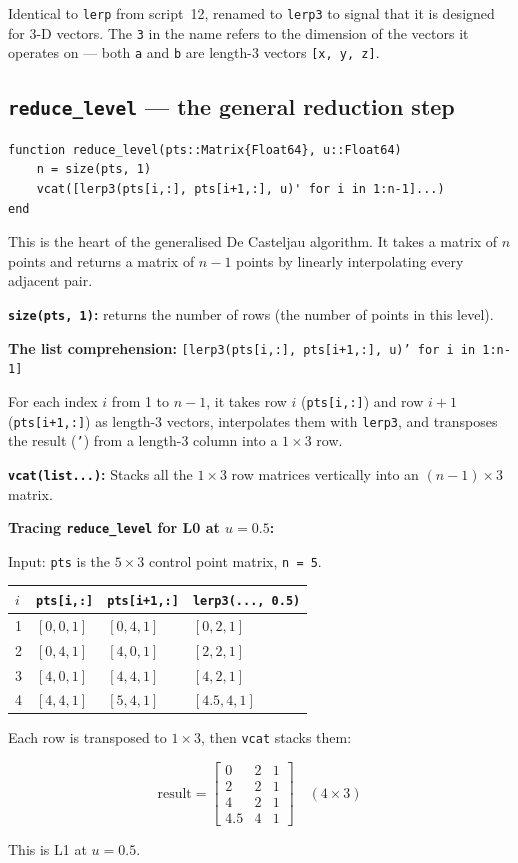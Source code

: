 \documentclass[12pt, a4paper]{article}
\newcommand{\cd}[1]{\texttt{#1}}
\begin{document}
Identical to \cd{lerp} from script~12, renamed to
\cd{lerp3} to signal that it is designed for 3-D vectors.
The \cd{3} in the name refers to the dimension of the
vectors it operates on --- both \cd{a} and \cd{b} are
length-3 vectors \cd{[x, y, z]}.

\subsection{\texttt{reduce\_level} --- the general reduction step}

\begin{verbatim}
function reduce_level(pts::Matrix{Float64}, u::Float64)
    n = size(pts, 1)
    vcat([lerp3(pts[i,:], pts[i+1,:], u)' for i in 1:n-1]...)
end
\end{verbatim}

This is the heart of the generalised De Casteljau algorithm.
It takes a matrix of $n$ points and returns a matrix of
$n-1$ points by linearly interpolating every adjacent pair.

\textbf{\cd{size(pts, 1)}:} returns the number of rows
(the number of points in this level).

\textbf{The list comprehension:}
\cd{[lerp3(pts[i,:], pts[i+1,:], u)' for i in 1:n-1]}

For each index $i$ from 1 to $n-1$, it takes row $i$
(\cd{pts[i,:]}) and row $i+1$ (\cd{pts[i+1,:]}) as
length-3 vectors, interpolates them with \cd{lerp3},
and transposes the result (\cd{'}) from a length-3
column into a $1\times3$ row.

\textbf{\cd{vcat(list...)}:}
Stacks all the $1\times3$ row matrices vertically
into an $(n-1)\times3$ matrix.

\begin{examplebox}
\textbf{Tracing \cd{reduce\_level} for L0 at $u=0.5$:}

Input: \cd{pts} is the $5\times3$ control point matrix,
\cd{n = 5}.

\medskip
\begin{tabular}{llll}
\toprule
$i$ & \cd{pts[i,:]} & \cd{pts[i+1,:]} & \cd{lerp3(..., 0.5)} \\
\midrule
1 & $[0,0,1]$ & $[0,4,1]$ & $[0,2,1]$ \\
2 & $[0,4,1]$ & $[4,0,1]$ & $[2,2,1]$ \\
3 & $[4,0,1]$ & $[4,4,1]$ & $[4,2,1]$ \\
4 & $[4,4,1]$ & $[5,4,1]$ & $[4.5,4,1]$ \\
\bottomrule
\end{tabular}

\medskip
Each row is transposed to $1\times3$, then \cd{vcat} stacks them:

\[
  \text{result} =
  \begin{bmatrix}
    0   & 2 & 1 \\
    2   & 2 & 1 \\
    4   & 2 & 1 \\
    4.5 & 4 & 1
  \end{bmatrix}
  \quad (4\times3)
\]

This is L1 at $u=0.5$. \checkmark
\end{examplebox}
\end{document}
